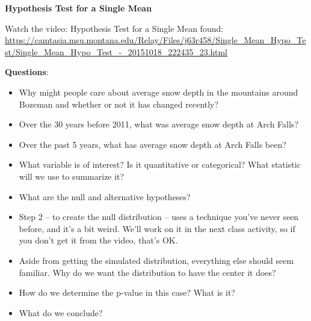 \def\theTopic{Reading 13}
\large
\begin{center}
  {\bf Hypothesis Test for a Single Mean}
\end{center}

Watch the video: Hypothesis Test for a Single Mean found:\\
\url{https://camtasia.msu.montana.edu/Relay/Files/j63r458/Single_Mean_Hypo_Test/Single_Mean_Hypo_Test_-_20151018_222435_23.html}

{\bf Questions}:
\begin{itemize}
  \item Why might people care about average snow depth in the
    mountains around Bozeman and whether or not it has changed
    recently?\vspace{2cm}
  \item Over the 30 years before 2011, what was average snow depth at
    Arch Falls?\vspace{2cm} %
  \item Over the past 5 years, what has average snow depth at Arch
    Falls been? \vspace{2cm}%
  \item What variable is of interest? Is it quantitative or
    categorical? What statistic will we use to summarize it?\vspace{2cm}
  \item What are the null and alternative hypotheses?\vspace{2cm}
  \item Step 2 -- to create the null distribution -- uses a technique
    you've never seen before, and it's a bit weird. We'll work on it
    in the next class activity, so if you don't get it from the video,
    that's OK.\vspace{2cm}
  \item Aside from getting the simulated distribution, everything else
    should seem familiar. Why do we want the distribution to have the
    center it does?\vspace{2cm}
  \item How do we determine the p-value in this case? What is
    it?\vspace{2cm}  
  \item What do we conclude?\vspace*{\fill}
\end{itemize}

\normalsize
